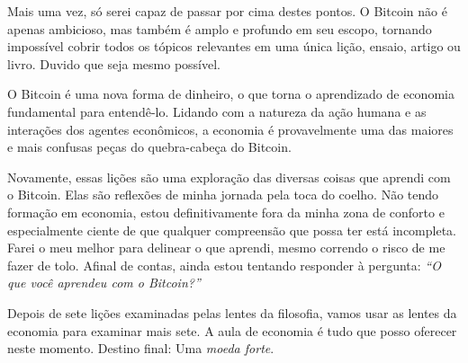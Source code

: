 Mais uma vez, só serei capaz de passar por cima destes pontos. O Bitcoin não é apenas ambicioso, mas também é amplo e profundo em seu escopo, tornando impossível cobrir todos os tópicos relevantes em uma única lição, ensaio, artigo ou livro. Duvido que seja mesmo possível.

O Bitcoin é uma nova forma de dinheiro, o que torna o aprendizado de economia fundamental para entendê-lo. Lidando com a natureza da ação humana e as interações dos agentes econômicos, a economia é provavelmente uma das maiores e mais confusas peças do quebra-cabeça do Bitcoin.

Novamente, essas lições são uma exploração das diversas coisas que aprendi com o Bitcoin. Elas são reflexões de minha jornada pela toca do coelho. Não tendo formação em economia, estou definitivamente fora da minha zona de conforto e especialmente ciente de que qualquer compreensão que possa ter está incompleta. Farei o meu melhor para delinear o que aprendi, mesmo correndo o risco de me fazer de tolo. Afinal de contas, ainda estou tentando responder à pergunta: \textit{\enquote{O que você aprendeu com o Bitcoin?}}

Depois de sete lições examinadas pelas lentes da filosofia, vamos usar as lentes da economia para examinar mais sete. A aula de economia é tudo que posso oferecer neste momento. Destino final: Uma \textit{moeda forte}.

